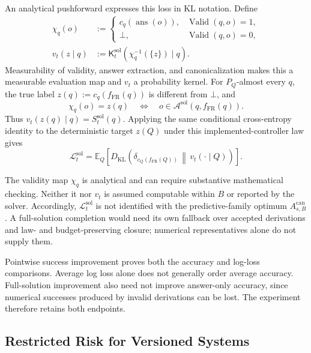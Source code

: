 \documentclass[10pt]{article} %
\providecommand{\1}{\mathbf{1}}  %
\theoremstyle{remark}
\theoremstyle{definition}
\begin{document}
An analytical pushforward expresses this loss in KL notation. Define
\begin{equation}
\begin{aligned}
\chi_q(o)&:=
\begin{cases}
c_q(\operatorname{ans}(o)),&\operatorname{Valid}(q,o)=1,\\
\bot,&\operatorname{Valid}(q,o)=0,
\end{cases}\\
v_t(z\mid q)&:=\mathsf K_t^{\mathrm{sol}}(\chi_q^{-1}(\{z\})\mid q).
\end{aligned}
\label{eq:reuse-validity-pushforward}
\end{equation}
Measurability of validity, answer extraction, and canonicalization makes
this a measurable evaluation map and $v_t$ a probability kernel. For
$P_Q$-almost every $q$, the true label
$z(q):=c_q(f_{\mathrm{FR}}(q))$ is different from $\bot$, and
\[
\chi_q(o)=z(q)
\quad\Longleftrightarrow\quad
o\in\mathcal A^{\mathrm{sol}}(q,f_{\mathrm{FR}}(q)).
\]
Thus $v_t(z(q)\mid q)=S_t^{\mathrm{sol}}(q)$. Applying the same
conditional cross-entropy identity to the deterministic target $z(Q)$
under this implemented-controller law gives
\begin{equation}
\mathcal L_t^{\mathrm{sol}}
=\mathbb E_Q\!\left[
D_{\mathrm{KL}}\!\left(
\delta_{c_Q(f_{\mathrm{FR}}(Q))}
\,\middle\|\,v_t(\cdot\mid Q)\right)\right].
\label{eq:reuse-log-loss-kl}
\end{equation}

The validity map $\chi_q$ is analytical and can require substantive
mathematical checking. Neither it nor $v_t$ is assumed computable within
$B$ or reported by the solver. Accordingly,
$\mathcal L_t^{\mathrm{sol}}$ is not identified with the predictive-family
optimum $A_{s,B}^{\mathrm{can}}$. A full-solution completion would need
its own fallback over accepted derivations and law- and budget-preserving
closure; numerical representatives alone do not supply them.

Pointwise success improvement proves both the accuracy and log-loss
comparisons. Average log loss alone does not generally order average
accuracy. Full-solution improvement also need not improve answer-only
accuracy, since numerical successes produced by invalid derivations can
be lost. The experiment therefore retains both endpoints.

\subsection{Restricted Risk for Versioned Systems}
\label{subsec:restricted-risk}
\end{document}
